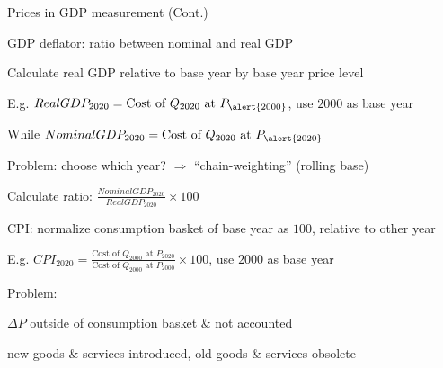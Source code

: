 \documentclass[11pt,aspectratio=169,usenames,dvipsnames]{beamer}
\let\tempone\itemize
\let\temptwo\enditemize
\renewenvironment{itemize}{\tempone\addtolength{\itemsep}{\fill}}{\temptwo}
\let\tempa\enumerate
\let\tempb\endenumerate
\renewenvironment{enumerate}{\tempa\addtolength{\itemsep}{\fill}}{\tempb}
\begin{document}
\begin{frame}{Prices in GDP measurement (Cont.)}
\label{slide:Prices_in_GDP_measurement__Cont__}
    \begin{itemize}
        \item GDP deflator: ratio between nominal and real GDP
        \begin{enumerate}
            \item Calculate real GDP relative to base year by base year \alert{price level}
            \begin{itemize}
                \item E.g. $ RealGDP_{2020} = \text{Cost of } Q_{2020} \text{ at } P_{\alert{2000}} $, use $ 2000 $ as base year
                \item While $ NominalGDP_{2020} = \text{Cost of } Q_{2020} \text{ at } P_{\alert{2020}} $
                \item \alert{Problem}: choose which year? $ \Rightarrow  $ ``\alert{chain-weighting}'' (rolling base)
            \end{itemize}
            \item Calculate ratio: $ \frac{NominalGDP_{2020}}{RealGDP_{2020}} \times 100 $
        \end{enumerate}
        \item CPI: normalize \alert{consumption basket} of \alert{base year} as $ 100 $, relative to \alert{other year}
        \begin{itemize}
            \item E.g. $ CPI_{2020} = \frac{\text{Cost of } Q_{2000} \text{ at } P_{2020}}{\text{Cost of } Q_{2000} \text{ at } P_{2000}} \times 100 $, use $ 2000 $ as base year
            \item \alert{Problem}:
            \begin{enumerate}
                \item $ \Delta P $ outside of consumption basket \&  not accounted
                \item new goods \& services introduced, old goods \& services obsolete
            \end{enumerate}
        \end{itemize}
    \end{itemize}
\end{frame}
\end{document}
